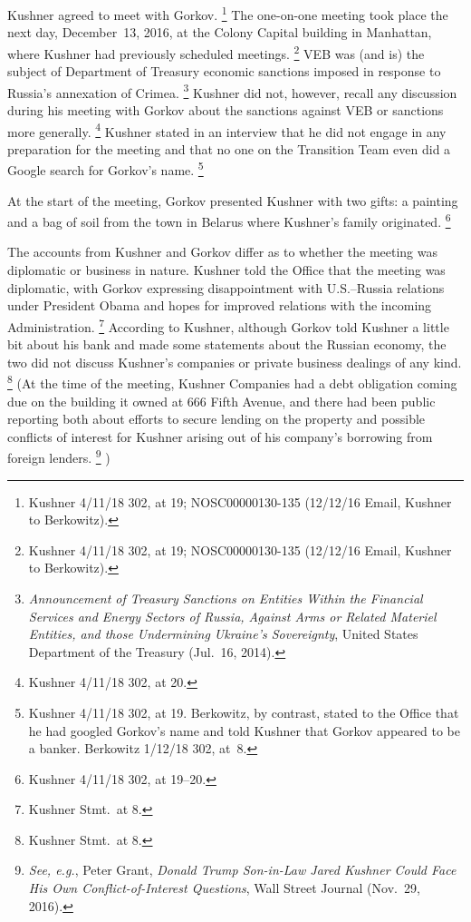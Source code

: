 Kushner agreed to meet with Gorkov.%
\footnote{Kushner 4/11/18 302, at 19;
NOSC00000130-135 (12/12/16 Email, Kushner to Berkowitz).}
The one-on-one meeting took place the next day, December~13, 2016, at the Colony Capital building in Manhattan, where Kushner had previously scheduled meetings.%
\footnote{Kushner 4/11/18 302, at 19;
NOSC00000130-135 (12/12/16 Email, Kushner to Berkowitz).}
VEB was (and is) the subject of Department of Treasury economic sanctions imposed in response to Russia's annexation of Crimea.%
\footnote{\textit{Announcement of Treasury Sanctions on Entities Within the Financial Services and Energy Sectors of Russia, Against Arms or Related Materiel Entities, and those Undermining Ukraine's Sovereignty}, United States Department of the Treasury (Jul.~16, 2014).}
Kushner did not, however, recall any discussion during his meeting with Gorkov about the sanctions against VEB or sanctions more generally.%
\footnote{Kushner 4/11/18 302, at 20.}
Kushner stated in an interview that he did not engage in any preparation for the meeting and that no one on the Transition Team even did a Google search for Gorkov's name.%
\footnote{Kushner 4/11/18 302, at 19.
Berkowitz, by contrast, stated to the Office that he had googled Gorkov's name and told Kushner that Gorkov appeared to be a banker.
Berkowitz 1/12/18 302, at~8.}

At the start of the meeting, Gorkov presented Kushner with two gifts: a painting and a bag of soil from the town in Belarus where Kushner's family originated.%
\footnote{Kushner 4/11/18 302, at 19--20.}

The accounts from Kushner and Gorkov differ as to whether the meeting was diplomatic or business in nature.
Kushner told the Office that the meeting was diplomatic, with Gorkov expressing disappointment with U.S.--Russia relations under President Obama and hopes for improved relations with the incoming Administration.%
\footnote{Kushner Stmt.\ at 8.}
According to Kushner, although Gorkov told Kushner a little bit about his bank and made some statements about the Russian economy, the two did not discuss Kushner's companies or private business dealings of any kind.%
\footnote{Kushner Stmt.\ at 8.}
(At the time of the meeting, Kushner Companies had a debt obligation coming due on the building it owned at 666 Fifth Avenue, and there had been public reporting both about efforts to secure lending on the property and possible conflicts of interest for Kushner arising out of his company's borrowing from foreign lenders.%
\footnote{\textit{See, e.g.}, Peter Grant, \textit{Donald Trump Son-in-Law Jared Kushner Could Face His Own Conflict-of-Interest Questions}, Wall Street Journal (Nov.~29, 2016).}%
)

